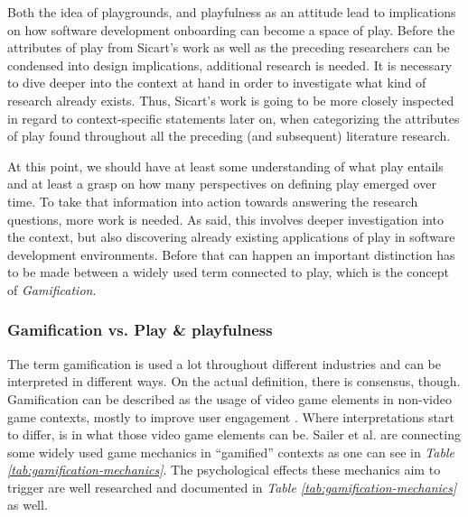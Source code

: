 Both the idea of playgrounds, and playfulness as an attitude lead to implications on how software development onboarding can become a space of play. Before the attributes of play from Sicart's work as well as the preceding researchers can be condensed into design implications, additional research is needed. It is necessary to dive deeper into the context at hand in order to investigate what kind of research already exists. Thus, Sicart's work is going to be more closely inspected in regard to context-specific statements later on, when categorizing the attributes of play found throughout all the preceding (and subsequent) literature research.

At this point, we should have at least some understanding of what play entails and at least a grasp on how many perspectives on defining play emerged over time. To take that information into action towards answering the research questions, more work is needed. As said, this involves deeper investigation into the context, but also discovering already existing applications of play in software development environments. Before that can happen an important distinction has to be made between a widely used term connected to play, which is the concept of \textit{Gamification}.

\subsubsection{Gamification vs. Play \& playfulness}

The term gamification is used a lot throughout different industries and can be interpreted in different ways. On the actual definition, there is consensus, though. Gamification can be described as the usage of video game elements in non-video game contexts, mostly to improve user engagement \cite{deterding2011gamification}. Where interpretations start to differ, is in what those video game elements can be. Sailer et al. are connecting some widely used game mechanics in \enquote{gamified} contexts as one can see in \textit{Table \ref{tab:gamification-mechanics}}. The psychological effects these mechanics aim to trigger are well researched and documented in \textit{Table \ref{tab:gamification-mechanics}} as well.

